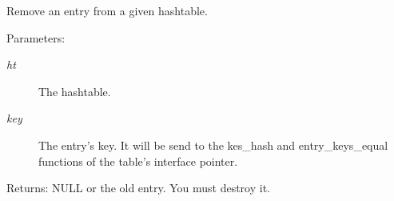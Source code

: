 Remove an entry from a given hashtable. 

\begin{Desc}
\item[Parameters:]
\begin{description}
\item[{\em ht}]The hashtable. \item[{\em key}]The entry's key. It will be send to the kes\_\-hash and entry\_\-keys\_\-equal functions of the table's interface pointer. \end{description}
\end{Desc}
\begin{Desc}
\item[Returns:]NULL or the old entry. You must destroy it. \end{Desc}
